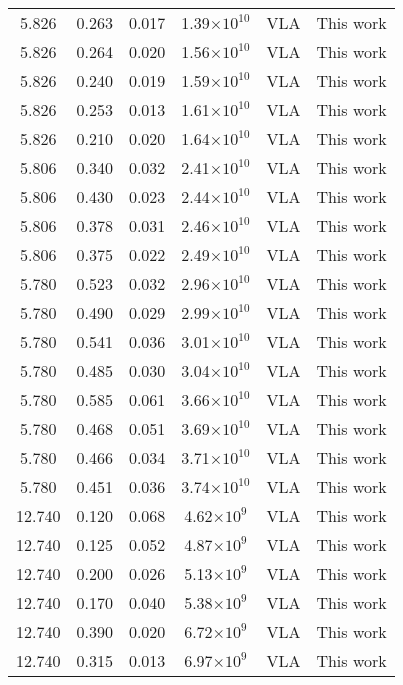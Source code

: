 \documentclass{aa}
\begin{document}
{\begin{longtable}{c|c|c|c|c|c}
  5.826 &   0.263   &  0.017 &  1.39$\times 10^{10}$ &  VLA & This work \\
  5.826 &   0.264   &  0.020 &  1.56$\times 10^{10}$ &  VLA & This work \\
  5.826 &   0.240   &  0.019 &  1.59$\times 10^{10}$ &  VLA & This work \\
  5.826 &   0.253   &  0.013 &  1.61$\times 10^{10}$ &  VLA & This work \\
  5.826 &   0.210   &  0.020 &  1.64$\times 10^{10}$ &  VLA & This work \\
  5.806 &   0.340   &  0.032 &  2.41$\times 10^{10}$ &  VLA & This work \\
  5.806 &   0.430   &  0.023 &  2.44$\times 10^{10}$ &  VLA & This work \\
  5.806 &   0.378   &  0.031 &  2.46$\times 10^{10}$ &  VLA & This work \\
  5.806 &   0.375   &  0.022 &  2.49$\times 10^{10}$ &  VLA & This work \\
  5.780 &   0.523   &  0.032 &  2.96$\times 10^{10}$ &  VLA & This work \\
  5.780 &   0.490   &  0.029 &  2.99$\times 10^{10}$ &  VLA & This work \\
  5.780 &   0.541   &  0.036 &  3.01$\times 10^{10}$ &  VLA & This work \\
  5.780 &   0.485   &  0.030 &  3.04$\times 10^{10}$ &  VLA & This work \\
  5.780 &   0.585   &  0.061 &  3.66$\times 10^{10}$ &  VLA & This work \\
  5.780 &   0.468   &  0.051 &  3.69$\times 10^{10}$ &  VLA & This work \\
  5.780 &   0.466   &  0.034 &  3.71$\times 10^{10}$ &  VLA & This work \\
  5.780 &   0.451   &  0.036 &  3.74$\times 10^{10}$ &  VLA & This work \\
 12.740 &   0.120   &  0.068 &  4.62$\times 10^{9}$  &  VLA & This work \\
 12.740 &   0.125   &  0.052 &  4.87$\times 10^{9}$  &  VLA & This work \\
 12.740 &   0.200   &  0.026 &  5.13$\times 10^{9}$  &  VLA & This work \\
 12.740 &   0.170   &  0.040 &  5.38$\times 10^{9}$  &  VLA & This work \\
 12.740 &   0.390   &  0.020 &  6.72$\times 10^{9}$  &  VLA & This work \\
 12.740 &   0.315   &  0.013 &  6.97$\times 10^{9}$  &  VLA & This work \\

\end{longtable}}
\end{document}
